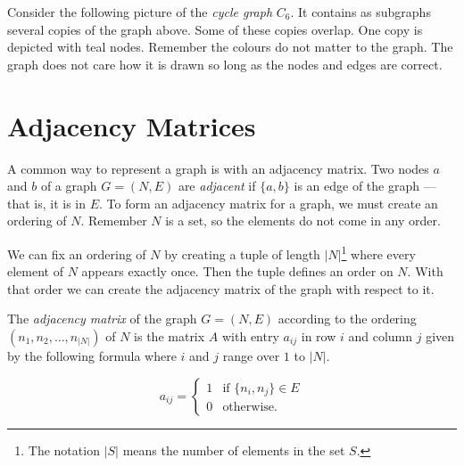 \documentclass{iansnotes}
\begin{document}
  Consider the following picture of the \emph{cycle graph} $C_6$.
  It contains as subgraphs several copies of the graph above.
  Some of these copies overlap.
  One copy is depicted with teal nodes.
  Remember the colours do not matter to the graph.
  The graph does not care how it is drawn so long as the nodes and edges are correct.
  \begin{center}
  \end{center}

\section{Adjacency Matrices}
  A common way to represent a graph is with an adjacency matrix.
  Two nodes $a$ and $b$ of a graph $G = (N, E)$ are \emph{adjacent} if $\{a,b\}$ is an edge of the graph --- that is, it is in $E$.
  To form an adjacency matrix for a graph, we must create an ordering of $N$.
  Remember $N$ is a set, so the elements do not come in any order.
  
  We can fix an ordering of $N$ by creating a tuple of length $|N|$\footnote{The notation $|S|$ means the number of elements in the set $S$.} where every element of $N$ appears exactly once.
  Then the tuple defines an order on $N$.
  With that order we can create the adjacency matrix of the graph with respect to it.

  The \emph{adjacency matrix} of the graph $G = (N, E)$ according to the ordering $(n_1, n_2, \ldots, n_{|N|})$ of $N$ is the matrix $A$ with entry $a_{ij}$ in row $i$ and column $j$ given by the following formula where $i$ and $j$ range over $1$ to $|N|$.
  
  \[ a_{ij} = \begin{cases} 1 & \text{if } \{n_i, n_j\} \in E \\ 0 & \text{otherwise.} \end{cases}\]
\end{document}
